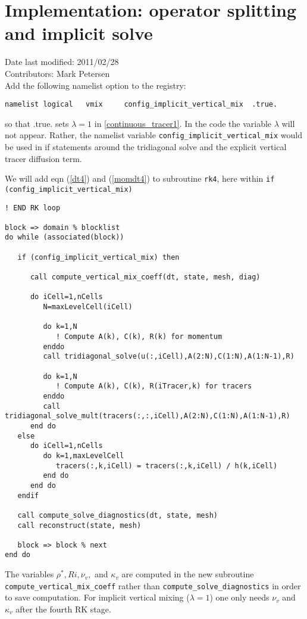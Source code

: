 \documentclass[11pt]{report}
\begin{document}
\section{Implementation: operator splitting and implicit solve}
Date last modified: 2011/02/28 \\
Contributors: Mark Petersen \\

Add the following namelist option to the registry:
\begin{verbatim}
namelist logical   vmix     config_implicit_vertical_mix  .true.
\end{verbatim}
so that .true. sets $\lambda=1$ in \ref{continuous_tracer1}.  In the code the variable $\lambda$ will not appear.  Rather, the namelist variable \verb=config_implicit_vertical_mix= would be used in if statements around the tridiagonal solve and the explicit vertical tracer diffusion term.

We will add eqn (\ref{dt4}) and (\ref{momdt4}) to subroutine \verb=rk4=, here within \verb=if (config_implicit_vertical_mix)=
\begin{verbatim}
! END RK loop 

block => domain % blocklist
do while (associated(block))

   if (config_implicit_vertical_mix) then

      call compute_vertical_mix_coeff(dt, state, mesh, diag)

      do iCell=1,nCells
         N=maxLevelCell(iCell)

         do k=1,N
            ! Compute A(k), C(k), R(k) for momentum
         enddo
         call tridiagonal_solve(u(:,iCell),A(2:N),C(1:N),A(1:N-1),R)

         do k=1,N
            ! Compute A(k), C(k), R(iTracer,k) for tracers
         enddo
         call tridiagonal_solve_mult(tracers(:,:,iCell),A(2:N),C(1:N),A(1:N-1),R)
      end do
   else
      do iCell=1,nCells
         do k=1,maxLevelCell
            tracers(:,k,iCell) = tracers(:,k,iCell) / h(k,iCell)
         end do
      end do
   endif

   call compute_solve_diagnostics(dt, state, mesh)
   call reconstruct(state, mesh)

   block => block % next
end do
\end{verbatim}
The variables $\rho^*, Ri, \nu_v,$ and $\kappa_v$ are computed in the new subroutine \verb=compute_vertical_mix_coeff= rather than \verb=compute_solve_diagnostics= in order to save computation.  For implicit vertical mixing ($\lambda=1$) one only needs $\nu_v$ and $\kappa_v$ after the fourth RK stage.
\end{document}
